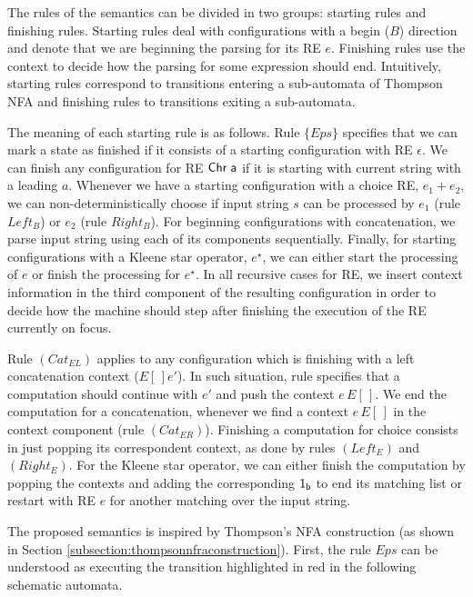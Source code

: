 \documentclass[sigplan]{acmart}
\theoremstyle{definition}
\newcommand{\C}[1]{\red{\mathsf{#1}}}
\newcommand{\V}[1]{\black{\mathsf{#1}}}
\begin{document}
The rules of the semantics can be divided in two groups: starting rules and finishing rules.
Starting rules deal with configurations with a begin ($B$) direction and denote that we are
beginning the parsing for its RE $e$. Finishing rules use the context to decide how the parsing
for some expression should end. Intuitively, starting rules correspond to transitions entering a
sub-automata of Thompson NFA and finishing rules to transitions exiting a sub-automata.

The meaning of each starting rule is as follows. Rule $\{Eps\}$ specifies that we can mark a state as
finished if it consists of a starting configuration with RE $\epsilon$. We can finish any configuration
for RE \ensuremath{\C{Chr}\;\V{a}} if it is starting with current string with a leading $a$. Whenever we have a starting configuration
with a choice RE, $e_1 + e_2$, we can non-deterministically choose if input string $s$ can be processed by
$e_1$ (rule $Left_B$) or $e_2$ (rule $Right_B$). For beginning configurations with concatenation, we parse
input string using each of its components sequentially. Finally, for starting configurations with a Kleene
star operator, $e^\star$, we can either start the processing of $e$ or finish the processing for $e^\star$.
In all recursive cases for RE, we insert context information in the third component of the resulting
configuration in order to decide how the machine should step after finishing the execution of the RE
currently on focus.

Rule $(Cat_{EL})$ applies to any configuration which is finishing with a left concatenation context ($E[\,]e'$).
In such situation, rule specifies that a computation should continue with $e'$ and push the context $e\,E[\,]$.
We end the computation for a concatenation, whenever we find a context $e\,E[\,]$ in the context component
(rule $(Cat_{ER})$). Finishing a computation for choice consists in just popping its correspondent context,
as done by rules $(Left_E)$ and $(Right_E)$. For the Kleene star operator, we can either finish the computation
by popping the contexts and adding the corresponding \ensuremath{\C{1_b}} to end its matching list or restart with RE $e$ for
another matching over the input string.

The proposed semantics is inspired by Thompson's NFA construction
(as shown in Section \ref{subsection:thompsonnfraconstruction}).
First, the rule $Eps$ can be understood as executing the transition highlighted
in red in the following schematic automata.

\begin{center}
\end{center}
\end{document}
